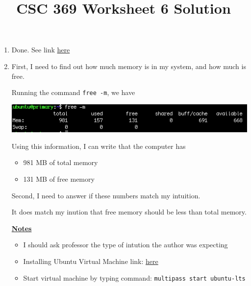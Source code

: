 \documentclass[12pt]{article}
\begin{document}
\title{CSC 369 Worksheet 6 Solution}

\maketitle

\bigskip

\begin{enumerate}[1.]
    \item Done. See link \href{https://www.man7.org/linux/man-pages/man1/free.1.html}{here}
    \item

    First, I need to find out how much memory is in my system, and how much is free.

    Running the command \texttt{free -m}, we have

    \begin{center}
    \includegraphics[width=0.8\linewidth]{images/worksheet_6_solution_1.png}
    \end{center}


    Using this information, I can write that the computer has

    \bigskip

    \begin{itemize}
        \item 981 MB of total memory
        \item 131 MB of free memory
    \end{itemize}

    \bigskip

    Second, I need to answer if these numbers match my intuition.

    \bigskip

    It does match my inution that free memory should be less than
    total memory.

    \bigskip

    \underline{\textbf{Notes}}

    \begin{itemize}
        \item I should ask professor the type of intution the author was expecting
        \item Installing Ubuntu Virtual Machine link: \href{https://multipass.run/}{here}
        \item Start virtual machine by typing command: \texttt{multipass start ubuntu-lts}
    \end{itemize}


\end{enumerate}
\end{document}
